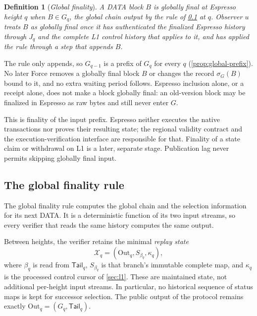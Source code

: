 \documentclass[11pt,a4paper]{article}
\newcommand{\defterm}[1]{\textcolor{rrBlue}{\textit{#1}}}
\newtheorem{definition}{Definition}[section]
\newcounter{protocol}
\begin{document}
\begin{definition}[\defterm{Global finality}]
\label{def:global-finality}
A DATA block $B$ is \defterm{globally final at Espresso height $q$} when
$B\in G_q$, the global chain output by the rule of \cref{sec:exports} at
$q$. Observer $u$ treats $B$ as globally final once it has authenticated
the finalized Espresso history through $J_q$ and the complete L1 control
history that applies to it, and has applied the rule through a step that
appends $B$.
\end{definition}

The rule only appends, so $G_{q-1}$ is a prefix of $G_q$ for every $q$
(\cref{prop:global-prefix}). No later Force removes a globally final
block $B$ or changes the record $\sigma_G(B)$ bound to it, and no extra waiting period
follows. Espresso inclusion alone, or a receipt alone, does not make a
block globally final: an old-version block may be finalized in Espresso
as raw bytes and still never enter $G$.

This is finality of the input prefix. Espresso neither executes the
native transactions nor proves their resulting state; the regional
validity contract and the execution-verification interface are
responsible for that. Finality of a state claim or withdrawal on L1 is a
later, separate stage. Publication lag never permits skipping globally
final input.

\subsection{The global finality rule}
\label{sec:exports}
The global finality rule computes the global chain and the selection
information for its next DATA. It is a deterministic function of its
two input streams, so every verifier that reads the same history
computes the same output.

Between heights, the verifier retains the minimal \defterm{replay state}
\[
 \mathcal X_q=(\mathrm{Out}_q,S_{\beta_q},\kappa_q),
\]
where $\beta_q$ is read from $\mathsf{Tail}_q$, $S_{\beta_q}$ is that
branch's immutable complete map, and $\kappa_q$ is the processed control
cursor of \cref{sec:l1}. These are maintained state, not additional
per-height input streams. In particular, no historical sequence of
status maps is kept for successor selection. The public output of the
protocol remains exactly $\mathrm{Out}_q=(G_q,\mathsf{Tail}_q)$.
\end{document}
